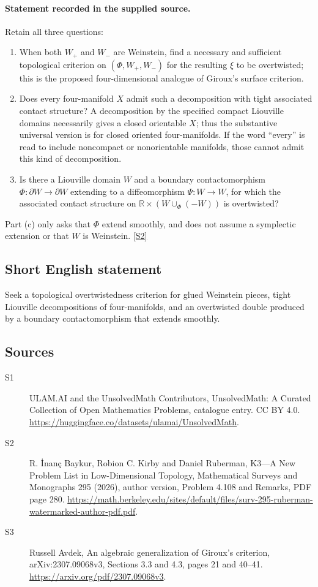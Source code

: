 \documentclass[11pt]{article}
\newcommand{\sref}[2]{\hyperlink{source:#1:#2}{[S#2]}}
\begin{document}
\paragraph{Statement recorded in the supplied source.}
Retain all three questions:
\begin{enumerate}
\item[(a)] When both $W_+$ and $W_-$ are Weinstein, find a necessary and sufficient topological criterion on $(\Phi,W_+,W_-)$ for the resulting $\xi$ to be overtwisted; this is the proposed four-dimensional analogue of Giroux's surface criterion.
\item[(b)] Does every four-manifold $X$ admit such a decomposition with tight associated contact structure? A decomposition by the specified compact Liouville domains necessarily gives a closed orientable $X$; thus the substantive universal version is for closed oriented four-manifolds. If the word ``every'' is read to include noncompact or nonorientable manifolds, those cannot admit this kind of decomposition.
\item[(c)] Is there a Liouville domain $W$ and a boundary contactomorphism $\Phi:\partial W\to\partial W$ extending to a diffeomorphism $\Psi:W\to W$, for which the associated contact structure on $\mathbb R\times(W\cup_\Phi(-W))$ is overtwisted?
\end{enumerate}
Part (c) only asks that $\Phi$ extend smoothly, and does not assume a symplectic extension or that $W$ is Weinstein. \sref{statement}{2}
\subsection{Short English statement}
Seek a topological overtwistedness criterion for glued Weinstein pieces, tight Liouville decompositions of four-manifolds, and an overtwisted double produced by a boundary contactomorphism that extends smoothly.
\subsection{Sources}
\begin{description}
\item[\hypertarget{source:statement:1}{S1}] ULAM.AI and the UnsolvedMath Contributors, UnsolvedMath: A Curated Collection of Open Mathematics Problems, catalogue entry. CC BY 4.0. \url{https://huggingface.co/datasets/ulamai/UnsolvedMath}.
\item[\hypertarget{source:statement:2}{S2}] R. İnanç Baykur, Robion C. Kirby and Daniel Ruberman, K3—A New Problem List in Low-Dimensional Topology, Mathematical Surveys and Monographs 295 (2026), author version, Problem 4.108 and Remarks, PDF page 280. \url{https://math.berkeley.edu/sites/default/files/surv-295-ruberman-watermarked-author-pdf.pdf}.
\item[\hypertarget{source:statement:3}{S3}] Russell Avdek, An algebraic generalization of Giroux’s criterion, arXiv:2307.09068v3, Sections 3.3 and 4.3, pages 21 and 40--41. \url{https://arxiv.org/pdf/2307.09068v3}.
\end{description}
\label{end:statement}
\end{document}
